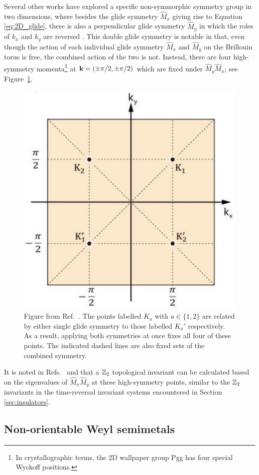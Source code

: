 Several other works have explored a specific non-symmorphic symmetry group in two dimensions, where besides the glide symmetry $\hat{M}_x$ giving rise to Equation \eqref{eq:2D_glide}, there is also a perpendicular glide symmetry $\hat{M}_y$ in which the roles of $k_x$ and $k_y$ are reversed \cite{HZY_RP2,WangZhang_acoustic-Klein-2D,Tao_quadrupole}. This double glide symmetry is notable in that, even though the action of each individual glide symmetry $\hat{M}_x$ and $\hat{M}_y$ on the Brillouin torus is free, the combined action of the two is not. Instead, there are four high-symmetry momenta\footnote{
	In crystallographic terms, the 2D wallpaper group Pgg has four special Wyckoff positions.}
at $\vb{k} = (\pm\pi/2,\pm\pi/2)$ which are fixed under $\hat{M}_y\hat{M}_x$; see Figure~\ref{fig:Pgg-fixed-points}.
\begin{figure}[htb!]
	\centering
	\includegraphics[width=.5\linewidth]{Images/Pgg-fixed-points}
	\caption{Figure from Ref.~\cite{WangZhang_acoustic-Klein-2D}. The points labelled $K_a$ with $a\in\{1,2\}$ are related by either single glide symmetry to those labelled $K_a'$ respectively. As a result, applying both symmetries at once fixes all four of these points. The indicated dashed lines are also fixed sets of the combined symmetry.}
	\label{fig:Pgg-fixed-points}
\end{figure}
It is noted in Refs.~\cite{HZY_RP2} and \cite{WangZhang_acoustic-Klein-2D} that a $\mathbb{Z}_2$ topological invariant can be calculated based on the eigenvalues of $\hat{M}_x\hat{M}_y$ at these high-symmetry points, similar to the $\mathbb{Z}_2$ invariants in the time-reversal invariant systems encountered in Section \ref{sec:insulators}.

\subsection{Non-orientable Weyl semimetals}


